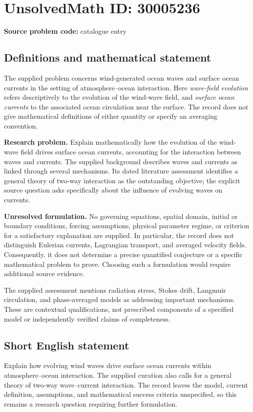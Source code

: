 \documentclass[11pt]{article}
\begin{document}
\section*{UnsolvedMath ID: 30005236}
\textbf{Source problem code:} catalogue entry
\subsection{Definitions and mathematical statement}
The supplied problem concerns wind-generated ocean waves and surface ocean currents in the setting of atmosphere--ocean interaction. Here \emph{wave-field evolution} refers descriptively to the evolution of the wind-wave field, and \emph{surface ocean currents} to the associated ocean circulation near the surface. The record does not give mathematical definitions of either quantity or specify an averaging convention.

\textbf{Research problem.} Explain mathematically how the evolution of the wind-wave field drives surface ocean currents, accounting for the interaction between waves and currents. The supplied background describes waves and currents as linked through several mechanisms. Its dated literature assessment identifies a general theory of two-way interaction as the outstanding objective; the explicit source question asks specifically about the influence of evolving waves on currents.

\textbf{Unresolved formulation.} No governing equations, spatial domain, initial or boundary conditions, forcing assumptions, physical parameter regime, or criterion for a satisfactory explanation are supplied. In particular, the record does not distinguish Eulerian currents, Lagrangian transport, and averaged velocity fields. Consequently, it does not determine a precise quantified conjecture or a specific mathematical problem to prove. Choosing such a formulation would require additional source evidence.

The supplied assessment mentions radiation stress, Stokes drift, Langmuir circulation, and phase-averaged models as addressing important mechanisms. These are contextual qualifications, not prescribed components of a specified model or independently verified claims of completeness.
\subsection{Short English statement}
Explain how evolving wind waves drive surface ocean currents within atmosphere--ocean interaction. The supplied curation also calls for a general theory of two-way wave--current interaction. The record leaves the model, current definition, assumptions, and mathematical success criteria unspecified, so this remains a research question requiring further formulation.
\end{document}
